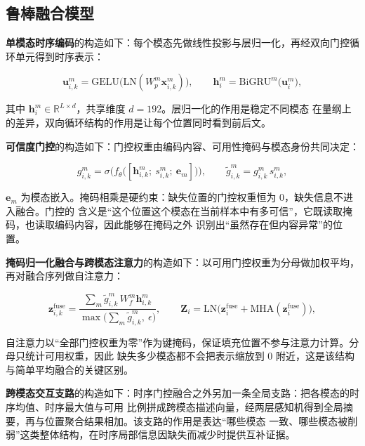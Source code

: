 \documentclass[bwprint]{gmcmthesis}
\begin{document}
\subsection{鲁棒融合模型}

\textbf{单模态时序编码}的构造如下：每个模态先做线性投影与层归一化，再经双向门控循环单元得到时序表示：

\begin{equation}
\mathbf{u}^{m}_{i,k}=\mathrm{GELU}\big(\mathrm{LN}(W^{m}_p\mathbf{x}^{m}_{i,k})\big),\qquad
\mathbf{h}^{m}_{i}=\mathrm{BiGRU}^{m}\big(\mathbf{u}^{m}_{i}\big),
\label{eq:encoder}
\end{equation}

其中 $\mathbf{h}^{m}_{i}\in\mathbb{R}^{L\times d}$，共享维度 $d=192$。层归一化的作用是稳定不同模态
在量纲上的差异，双向循环结构的作用是让每个位置同时看到前后文。

\textbf{可信度门控}的构造如下：门控权重由编码内容、可用性掩码与模态身份共同决定：

\begin{equation}
g^{m}_{i,k}=\sigma\Big(f_{\theta}\big([\mathbf{h}^{m}_{i,k};\ s^{m}_{i,k};\ \mathbf{e}_m]\big)\Big),
\qquad
\tilde{g}^{m}_{i,k}=g^{m}_{i,k}\,s^{m}_{i,k},
\label{eq:gate}
\end{equation}

$\mathbf{e}_m$ 为模态嵌入。掩码相乘是硬约束：缺失位置的门控权重恒为 0，缺失信息不进入融合。门控的
含义是“这个位置这个模态在当前样本中有多可信”，它既读取掩码，也读取编码内容，因此能够在掩码之外
识别出“虽然存在但内容异常”的位置。

\textbf{掩码归一化融合与跨模态注意力}的构造如下：以可用门控权重为分母做加权平均，再对融合序列做自注意力：

\begin{equation}
\mathbf{z}^{\mathrm{fuse}}_{i,k}
=\frac{\sum_m \tilde{g}^{m}_{i,k}\,W^{m}_f\mathbf{h}^{m}_{i,k}}
{\max\big(\sum_m \tilde{g}^{m}_{i,k},\ \epsilon\big)},
\qquad
\mathbf{Z}_i=\mathrm{LN}\Big(\mathbf{z}^{\mathrm{fuse}}_i+\mathrm{MHA}(\mathbf{z}^{\mathrm{fuse}}_i)\Big),
\label{eq:fusion}
\end{equation}

自注意力以“全部门控权重为零”作为键掩码，保证填充位置不参与注意力计算。分母只统计可用权重，因此
缺失多少模态都不会把表示缩放到 0 附近，这是该结构与简单平均融合的关键区别。

\textbf{跨模态交互支路}的构造如下：时序门控融合之外另加一条全局支路：把各模态的时序均值、时序最大值与可用
比例拼成跨模态描述向量，经两层感知机得到全局摘要，再与位置聚合结果相加。该支路的作用是表达“哪些模态
一致、哪些模态被削弱”这类整体结构，在时序局部信息因缺失而减少时提供互补证据。
\end{document}
